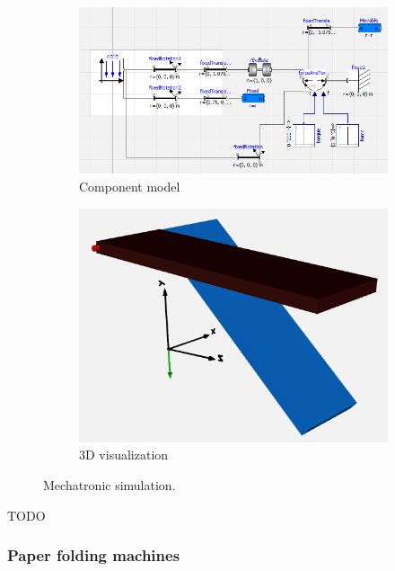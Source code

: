 \documentclass{PDS}
\begin{document}
\begin{figure}[htbp]
    \begin{subfigure}[b]{0.56\textwidth}
        \centering
        \includegraphics[width=\textwidth]{./figures/glasshouse_mechatronic_1.png}
        \caption{Component model}
    \end{subfigure}
    \hfill
    \begin{subfigure}[b]{0.4\textwidth}
        \centering
        \includegraphics[width=\textwidth]{./figures/glasshouse_mechatronic_2.png}
        \caption{3D visualization}
    \end{subfigure}
    \caption{Mechatronic simulation.}
\end{figure}

TODO

\subsubsection{Paper folding machines}
\label{sec:master-system-lego}
\end{document}
